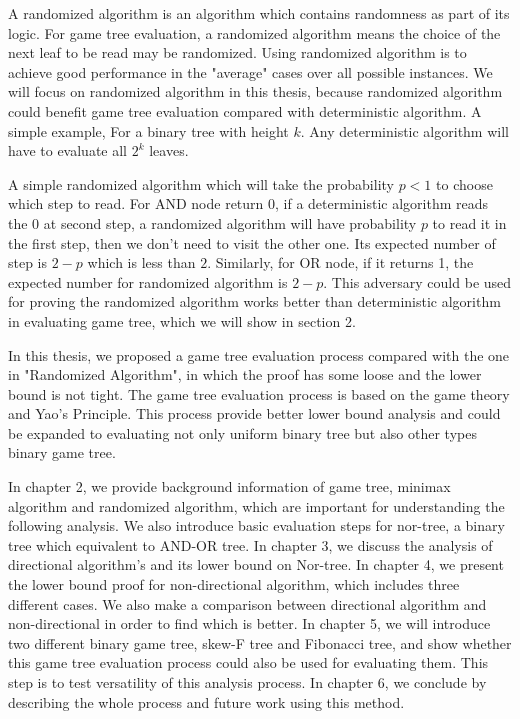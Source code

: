  A randomized algorithm is an algorithm which contains randomness as part of its logic. For game tree evaluation, a randomized algorithm means the choice of the next leaf to be read may be randomized. Using randomized algorithm is to achieve good performance in the "average" cases over all possible instances.\cite{RG} We will focus on randomized algorithm in this thesis, because randomized algorithm could benefit game tree evaluation compared with deterministic algorithm. A simple example, For a binary tree with height $k$. Any deterministic algorithm will have to evaluate all $2^k$ leaves. 
 
 A simple randomized algorithm which will take the probability $p<1$ to choose which step to read. For AND node return 0, if a deterministic algorithm reads the 0 at second step, a randomized algorithm will have probability $p$ to read it in the first step, then we don't need to visit the other one. Its expected number of step is $2-p$ which is less than $2$. Similarly, for OR node, if it returns 1, the expected number for randomized algorithm is $2-p$. This adversary could be used for proving the randomized algorithm works better than deterministic algorithm in evaluating game tree, which we will show in section 2.
 
 In this thesis, we proposed a game tree evaluation process compared with the one in "Randomized Algorithm", in which the proof has some loose and the lower bound is not tight. \cite{RANDOM1995} The game tree evaluation process is based on the game theory and Yao's Principle\cite{YAO}. This process provide better lower bound analysis and could be expanded to evaluating not only uniform binary tree but also other types binary game tree.

 In chapter 2, we provide background information of game tree, minimax algorithm and randomized algorithm, which are important for understanding the following analysis. We also introduce basic evaluation steps for nor-tree, a binary tree which equivalent to AND-OR tree. In chapter 3, we discuss the analysis of directional algorithm's and its lower bound on Nor-tree. In chapter 4, we  present the lower bound proof for non-directional algorithm, which includes three different cases. We also make a comparison between directional algorithm and non-directional in order to find which is better. In chapter 5, we will introduce two different binary game tree, skew-F tree and Fibonacci tree, and show whether this game tree evaluation process could also be used for evaluating them. This step is to test versatility of this analysis process.  In chapter 6, we conclude by describing the whole process and future work using this method.


%

\vfill

